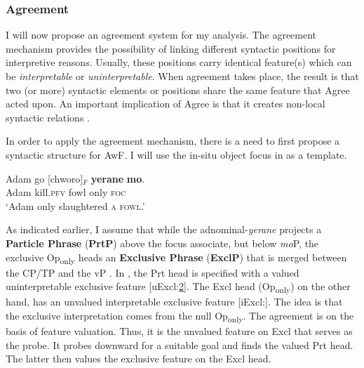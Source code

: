 \documentclass[output=paper,colorlinks,citecolor=brown,draftmode
]{langscibook}
\begin{document}
\subsubsection{Agreement}

I will now propose an agreement system for my analysis. The agreement mechanism provides the possibility of linking different syntactic positions for interpretive reasons. Usually, these positions carry identical feature(s) which can be \textit{interpretable} or \textit{uninterpretable}. When agreement takes place, the result is that two (or more) syntactic elements or positions share the same feature that Agree acted upon. An important implication of Agree is that it creates non-local syntactic relations \citep{chomsky2000minimalist, chomsky2001derivation}.

In order to apply the agreement mechanism, there is a need to first propose a syntactic structure for AwF. I will use the in-situ object focus in  as a template.

\ea \label{ex:Aremu: In-situ Object Awf 2}
\gll Adam go [chworo]$_F$ \textbf{yerane} \textbf{mo}.\\
	Adam kill.\textsc{pfv} fowl only \textsc{foc}\\
\glt `Adam only slaughtered \textsc{a fowl}.'
    
\z

As indicated earlier, I assume that while the adnominal-\textit{yerane} projects a \textbf{Particle Phrase} (\textbf{PrtP}) above the focus associate, but below \textit{mo}P, the exclusive Op\textsubscript{only} heads an \textbf{Exclusive Phrase} (\textbf{ExclP}) that is merged between the CP/TP and the vP . In , the Prt head is specified with a valued uninterpretable exclusive feature [uExcl:\uline{2}]. The Excl head (Op\textsubscript{only}) on the other hand, has an unvalued interpretable exclusive feature [iExcl:\uline{\hspace{0.3cm}}]. The idea is that the exclusive interpretation comes from the null Op\textsubscript{only}. The agreement is on the basis of feature valuation. Thus, it is the unvalued feature on Excl that serves as the probe. It probes downward for a suitable goal and finds the valued Prt head. The latter then values the exclusive feature on the Excl head.
\end{document}
